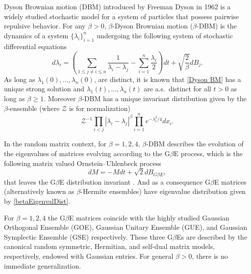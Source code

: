 \documentclass{amsart}
\numberwithin{equation}{section}
\newcommand{\sung}[2][]{\todo[color=green, #1]{\textbf{Sungwoo}: #2}}
\begin{document}
Dyson Brownian motion (DBM) introduced by Freeman Dyson in 1962 \cite{Dy62} is a widely studied stochastic model for a system of particles that possess pairwise repulsive behavior. For any $\beta >0$, $\beta$-Dyson Brownian motion ($\beta$-DBM) is the dynamics of a system $\{\lambda_i\}_{i=1}^{n}$ undergoing the following system of stochastic differential equations
\begin{equation}\label{Dyson BM}
d\lambda_i =\left(\sum_{1\leq j \neq i \leq n} \frac{1}{\lambda_i - \lambda_j}-\sum_{i=1}^{n}\frac{\lambda_i}{2}\right) dt  + \sqrt{\frac{2}{\beta}} d B_j.
\end{equation}
As long as  $\lambda_1(0),\dots ,\lambda_n(0)$, are distinct, it is known that \eqref{Dyson BM} has a unique strong solution and $\lambda_1(t),\dots ,\lambda_n(t)$ are a.s.\  distinct for all $t>0$ as long as $\beta \geq 1$. Moreover $\beta$-DBM has a unique invariant distribution given by the $\beta$-ensemble (where $\mathcal{Z}$ is for normalization)
\begin{equation}\label{betaEigenvalDist}
     \mathcal{Z}^{-1}\prod_{i<j}|\lambda_i -\lambda_j|^{\beta}\prod_{i=1}^n e^{-\lambda_i^2/4} dx_i.
\end{equation}


In the random matrix context, for $\beta=1,2,4$, $\beta$-DBM describes the evolution of the eigenvalues of matrices evolving according to the G$\beta$E process, which is the following matrix valued Ornstein--Uhlenbeck process 
\begin{equation}\label{G beta E Process}
    dM = -M dt +\sqrt{2}d B_{G\beta E},
\end{equation}
that leaves the G$\beta$E distribution invariant \cite{Anderson_Guionnet_Zeitouni_2009,forrester2010log}. And as a consequence G$\beta$E matrices (alternatively known as $\beta$-Hermite ensembles) have eigenvalue distribution given by \eqref{betaEigenvalDist}.


For $\beta=1,2,4$ the G$\beta$E matrices coincide with the highly studied Gaussian  Orthogonal Ensemble (GOE), Gaussian Unitary Ensemble (GUE), and Gaussian Symplectic Ensemble (GSE) respectively. These three G$\beta$Es are described by the canonical random symmetric, Hermitian, and self-dual matrix models, respectively, endowed with Gaussian entries. For general $\beta>0$, there is no immediate generalization.
\end{document}
